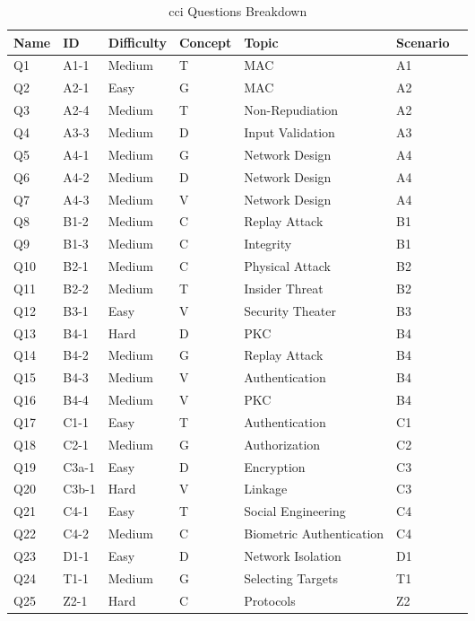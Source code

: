 \begin{table}[!ht]
\centering
\begin{tabular}{|l|l|l|l|l|l|l|}
\hline 
\textbf{Name} & \textbf{ID} & \textbf{Difficulty} & \textbf{Concept} & \textbf{Topic} & \textbf{Scenario} \\ \hline
Q1 & A1-1 & Medium & T & MAC & A1\\ \hline
Q2 & A2-1 & Easy & G & MAC & A2 \\ \hline
Q3 & A2-4 & Medium & T & Non-Repudiation & A2 \\ \hline
Q4 & A3-3 & Medium & D & Input Validation  & A3 \\ \hline
Q5 & A4-1 & Medium & G & Network Design & A4 \\ \hline
Q6 & A4-2 & Medium & D & Network Design & A4 \\ \hline
Q7 & A4-3 & Medium & V & Network Design & A4 \\ \hline
Q8 & B1-2 & Medium & C & Replay Attack & B1 \\ \hline
Q9 & B1-3 & Medium & C & Integrity & B1 \\ \hline
Q10 & B2-1 & Medium & C & Physical Attack & B2 \\ \hline
Q11 & B2-2 & Medium & T & Insider Threat & B2 \\ \hline
Q12 & B3-1 & Easy & V & Security Theater  & B3 \\ \hline
Q13 & B4-1 & Hard & D & PKC & B4 \\ \hline
Q14 & B4-2 & Medium & G & Replay Attack & B4 \\ \hline
Q15 & B4-3 & Medium & V & Authentication & B4 \\ \hline
Q16 & B4-4 & Medium & V & PKC & B4 \\ \hline
Q17 & C1-1 & Easy & T & Authentication & C1 \\ \hline
Q18 & C2-1 & Medium & G & Authorization & C2 \\ \hline
Q19 & C3a-1 & Easy & D & Encryption  & C3 \\ \hline
Q20 & C3b-1 & Hard & V & Linkage & C3 \\ \hline
Q21 & C4-1 & Easy & T & Social Engineering & C4 \\ \hline
Q22 & C4-2 & Medium & C & Biometric Authentication & C4 \\ \hline
Q23 & D1-1 & Easy & D & Network Isolation & D1 \\ \hline
Q24 & T1-1 & Medium & G & Selecting Targets & T1 \\ \hline
Q25 & Z2-1 & Hard & C & Protocols & Z2 \\ \hline
\end{tabular}
\caption{\gls{cci} Questions Breakdown}
\label{tab:final_question_breakdown}
\end{table}


